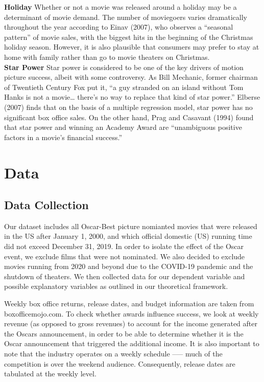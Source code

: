 \documentclass[11pt]{article} %
\begin{document}
\begin{adjustwidth}{1cm}{}
\textbf{Holiday}\newline
Whether or not a movie was released around a holiday may be a determinant of movie demand. The number of moviegoers varies dramatically throughout the year according to Einav (2007), who observes a “seasonal pattern” of movie sales, with the biggest hits in the beginning of the Christmas holiday season. However, it is also plausible that consumers may prefer to stay at home with family rather than go to movie theaters on Christmas. \\

\textbf{Star Power}\newline
Star power is considered to be one of the key drivers of motion picture success, albeit with some controversy. As Bill Mechanic, former chairman of Twentieth Century Fox put it, “a guy stranded on an island without Tom Hanks is not a movie… there's no way to replace that kind of star power.”  Elberse (2007) finds that on the basis of a multiple regression model, star power has no significant box office sales. On the other hand, Prag and Casavant (1994) found that star power and winning an Academy Award are “unambiguous positive factors in a movie’s financial success.” 
\end{adjustwidth}


\setlength{\parindent}{20pt}

\section{Data}
\subsection{Data Collection} 
Our dataset includes all Oscar-Best picture nomianted movies that were released in the US after January 1, 2000, and which official domestic (US) running time did not exceed December 31, 2019. In order to isolate the effect of the Oscar event, we exclude films that were not nominated. We also decided to exclude movies running from 2020 and beyond due to the COVID-19 pandemic and the shutdown of theaters. We then collected data for our dependent variable and possible explanatory variables as outlined in our theoretical framework. 

Weekly box office returns, release dates, and budget information are taken from boxofficemojo.com. To check whether awards influence success, we look at weekly revenue (as opposed to gross revenues) to account for the income generated after the Oscars announcement, in order to be able to determine whether it is the Oscar announcement that triggered the additional income. It is also important to note that the industry operates on a weekly schedule --— much of the competition is over the weekend audience. Consequently, release dates are tabulated at the weekly level. 
\end{document}
